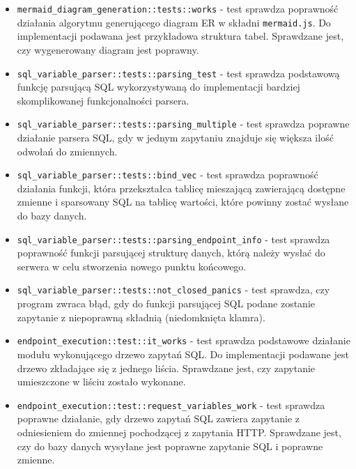 \begin{itemize}

    \item \verb|mermaid_diagram_generation::tests::works| - test sprawdza
        poprawność działania algorytmu generującego diagram ER w składni
        \verb|mermaid.js|. Do implementacji podawana jest przykładowa struktura
        tabel. Sprawdzane jest, czy wygenerowany diagram jest poprawny.

    \item \verb|sql_variable_parser::tests::parsing_test| - test sprawdza
        podstawową funkcję parsującą SQL wykorzystywaną do implementacji
        bardziej skomplikowanej funkcjonalności parsera.

    \item \verb|sql_variable_parser::tests::parsing_multiple| - test sprawdza
        poprawne działanie parsera SQL, gdy w jednym zapytaniu znajduje się
        większa ilość odwołań do zmiennych.

    \item \verb|sql_variable_parser::tests::bind_vec| - test sprawdza poprawność
        działania funkcji, która przekształca tablicę mieszającą zawierającą
        dostępne zmienne i sparsowany SQL na tablicę wartości, które powinny
        zostać wysłane do bazy danych.

    \item \verb|sql_variable_parser::tests::parsing_endpoint_info| - test
        sprawdza poprawność funkcji parsującej strukturę danych, którą należy
        wysłać do serwera w celu stworzenia nowego punktu końcowego.

    \item \verb|sql_variable_parser::tests::not_closed_panics| - test sprawdza,
        czy program zwraca błąd, gdy do funkcji parsującej SQL podane zostanie
        zapytanie z niepoprawną składnią (niedomknięta klamra).

    \item \verb|endpoint_execution::test::it_works| - test sprawdza podstawowe
        działanie modułu wykonującego drzewo zapytań SQL. Do implementacji
        podawane jest drzewo zkładające się z jednego liścia. Sprawdzane jest,
        czy zapytanie umieszczone w liściu zostało wykonane.
        
    \item \verb|endpoint_execution::test::request_variables_work| - test
        sprawdza poprawne działanie, gdy drzewo zapytań SQL zawiera zapytanie z
        odniesieniem do zmiennej pochodzącej z zapytania HTTP. Sprawdzane jest,
        czy do bazy danych wysyłane jest poprawne zapytanie SQL i poprawne
        zmienne.


\end{itemize}
